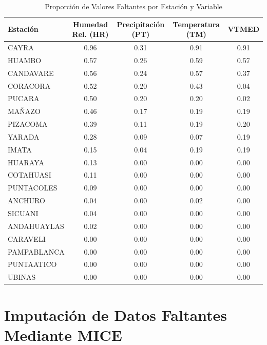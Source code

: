 \begin{table}[H]
    \centering
    \footnotesize  %
    \renewcommand{\arraystretch}{1.2}  %
    \setlength{\tabcolsep}{8pt}  %
    \caption{Proporción de Valores Faltantes por Estación y Variable}
    \begin{tabular}{lcccc}
    \hline
    \textbf{Estación} & \textbf{Humedad Rel. (HR)} & \textbf{Precipitación (PT)} & \textbf{Temperatura (TM)} & \textbf{VTMED} \\
    \hline
    CAYRA       & 0.96 & 0.31 & 0.91 & 0.91 \\
    HUAMBO      & 0.57 & 0.26 & 0.59 & 0.57 \\
    CANDAVARE   & 0.56 & 0.24 & 0.57 & 0.37 \\
    CORACORA    & 0.52 & 0.20 & 0.43 & 0.04 \\
    PUCARA      & 0.50 & 0.20 & 0.20 & 0.02 \\
    MAÑAZO      & 0.46 & 0.17 & 0.19 & 0.19 \\
    PIZACOMA    & 0.39 & 0.11 & 0.19 & 0.20 \\
    YARADA      & 0.28 & 0.09 & 0.07 & 0.19 \\
    IMATA       & 0.15 & 0.04 & 0.19 & 0.19 \\
    HUARAYA     & 0.13 & 0.00 & 0.00 & 0.00 \\
    COTAHUASI   & 0.11 & 0.00 & 0.00 & 0.00 \\
    PUNTACOLES  & 0.09 & 0.00 & 0.00 & 0.00 \\
    ANCHURO     & 0.04 & 0.00 & 0.02 & 0.00 \\
    SICUANI     & 0.04 & 0.00 & 0.00 & 0.00 \\
    ANDAHUAYLAS & 0.02 & 0.00 & 0.00 & 0.00 \\
    CARAVELI    & 0.00 & 0.00 & 0.00 & 0.00 \\
    PAMPABLANCA & 0.00 & 0.00 & 0.00 & 0.00 \\
    PUNTAATICO  & 0.00 & 0.00 & 0.00 & 0.00 \\
    UBINAS      & 0.00 & 0.00 & 0.00 & 0.00 \\
    \hline
    \end{tabular}
    \label{tab:datos_faltantes}
\end{table}


\section{Imputación de Datos Faltantes Mediante MICE}

